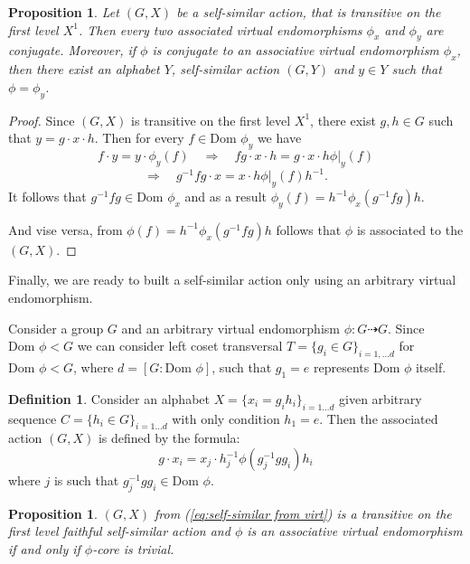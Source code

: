 \documentclass[a4paper,12pt]{amsart}
\newtheorem{proposition}[theorem]{Proposition}
\theoremstyle{definition}
\newtheorem{definition}{Definition}
\newcommand{\Dom}{\text{Dom }}
\begin{document}
	
	\begin{proposition}\label{virtual_end:conjugate}
		Let $(G, X)$ be a self-similar action, that is transitive on the first level $X^{1}$. Then every two associated virtual endomorphisms $\phi_x$ and $\phi_y$ are conjugate. Moreover, if $\phi$ is conjugate to an associative virtual endomorphism $\phi_x$, then there exist an alphabet $Y$, self-similar action $(G, Y)$ and $y \in Y$ such that $\phi = \phi_y$. 
	\end{proposition}

	\begin{proof}
		Since $(G, X)$ is transitive on the first level $X^{1}$, there exist $g, h \in G$ such that $y = g \cdot x \cdot h$. Then for every $f \in \Dom \phi_y$ we have 
		$$
		f \cdot y = y \cdot \phi_y(f) 
		\quad \Rightarrow \quad 
		f g \cdot x \cdot h = g \cdot x \cdot h \phi|_y (f)
		$$
		$$
		\Rightarrow \quad  g^{-1} fg \cdot x = x \cdot h \phi|_y(f) h^{-1}.
		$$
		It follows that $g^{-1} f g \in \Dom \phi_x$ and as a result $\phi_y(f) = h^{-1}\phi_x(g^{-1}fg)h$. 
		
		
		
		And vise versa, from $\phi(f) = h^{-1}\phi_x(g^{-1}fg)h$ follows that $\phi$ is associated to the $(G, X)$.
	\end{proof}
	
	
	Finally, we are ready to built a self-similar action only using an arbitrary virtual endomorphism. 
	
	Consider a group $G$ and an arbitrary virtual endomorphism $\phi : G \dashrightarrow G$. Since $\Dom \phi < G$ we can consider left coset transversal $T = \{g_i \in G\}_{i = 1, \dots d}$ for $ \Dom \phi < G$, where $d = [G : \Dom \phi]$, such that $g_1 = e$ represents $\Dom \phi$ itself. 
	
	
	\begin{definition}
		Consider an alphabet $X = \{x_i = g_i h_i\}_{i = 1 \dots d}$ given arbitrary sequence $C = \{h_i \in G\}_{i = 1 \dots d}$ with only condition $h_1 = e$. Then the associated action $(G, X)$ is defined by the formula: 
		\begin{equation}\label{eq:self-similar from virt}
			g \cdot x_i = x_j \cdot h^{-1}_j \phi(g_j^{-1} g g_i) h_i	
		\end{equation}
		where $j$ is such that $g^{-1}_j g g_i \in \Dom \phi$.
	\end{definition}
	
	
	\begin{proposition}
		$(G, X)$ from (\ref{eq:self-similar from virt}) is a transitive on the first level faithful self-similar action and $\phi$ is an associative virtual endomorphism if and only if $\phi$-core is trivial.
	\end{proposition}
	
\end{document}
